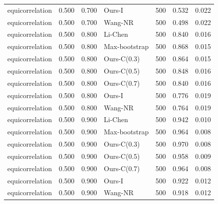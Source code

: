 \begin{tabular}{lrrlrrr}
equicorrelation & 0.500 & 0.700 & Ours-I & 500 & 0.532 & 0.022 \\
equicorrelation & 0.500 & 0.700 & Wang-NR & 500 & 0.498 & 0.022 \\
equicorrelation & 0.500 & 0.800 & Li-Chen & 500 & 0.840 & 0.016 \\
equicorrelation & 0.500 & 0.800 & Max-bootstrap & 500 & 0.868 & 0.015 \\
equicorrelation & 0.500 & 0.800 & Ours-C(0.3) & 500 & 0.864 & 0.015 \\
equicorrelation & 0.500 & 0.800 & Ours-C(0.5) & 500 & 0.848 & 0.016 \\
equicorrelation & 0.500 & 0.800 & Ours-C(0.7) & 500 & 0.840 & 0.016 \\
equicorrelation & 0.500 & 0.800 & Ours-I & 500 & 0.776 & 0.019 \\
equicorrelation & 0.500 & 0.800 & Wang-NR & 500 & 0.764 & 0.019 \\
equicorrelation & 0.500 & 0.900 & Li-Chen & 500 & 0.942 & 0.010 \\
equicorrelation & 0.500 & 0.900 & Max-bootstrap & 500 & 0.964 & 0.008 \\
equicorrelation & 0.500 & 0.900 & Ours-C(0.3) & 500 & 0.970 & 0.008 \\
equicorrelation & 0.500 & 0.900 & Ours-C(0.5) & 500 & 0.958 & 0.009 \\
equicorrelation & 0.500 & 0.900 & Ours-C(0.7) & 500 & 0.964 & 0.008 \\
equicorrelation & 0.500 & 0.900 & Ours-I & 500 & 0.922 & 0.012 \\
equicorrelation & 0.500 & 0.900 & Wang-NR & 500 & 0.918 & 0.012 \\
\bottomrule
\end{tabular}

